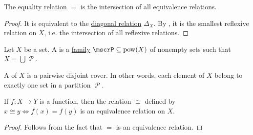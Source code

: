 \begin{proposition}\label{thm:equality_is_smallest_equivalence_relation}
  The equality \hyperref[def:relation]{relation} \( = \) is the intersection of all equivalence relations.
\end{proposition}
\begin{proof}
  It is equivalent to the \hyperref[def:binary_relation/diagonal]{diagonal relation} \( \Delta_X \). By , it is the smallest reflexive relation on \( X \), i.e. the intersection of all reflexive relations.
\end{proof}

\begin{definition}\label{def:set_partition}
  Let \( X \) be a set. A  is a \hyperref[rem:family_of_sets]{family} \( \mscrP \subseteq \pow(X) \) of nonempty sets such that \( X = \bigcup \mscrP \).

  A  of \( X \) is a pairwise disjoint cover. In other words, each element of \( X \) belong to exactly one set in a partition \( \mscrP \).
\end{definition}

\begin{lemma}\label{thm:equivalence_relation_inheriance}
  If \( f: X \to Y \) is a function, then the relation \( \cong \) defined by \( x \cong y \iff f(x) = f(y) \) is an equivalence relation on \( X \).
\end{lemma}
\begin{proof}
  Follows from the fact that \( = \) is an equivalence relation.
\end{proof}

